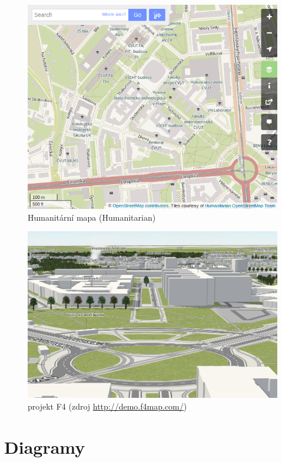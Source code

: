 \begin{figure}[H]
    \centering
    \includegraphics[width=11.5cm]{pictures/osm_humanitarian.png} 
    \caption{Humanitární mapa (Humanitarian)}
    \label{fig:humanitarian}
\end{figure}

\begin{figure}[H]
    \centering
    \includegraphics[width=11.5cm]{pictures/F4.png} 
    \caption{projekt F4 (zdroj \url{http://demo.f4map.com/})}
    \label{fig:F4}
\end{figure}


\chapter{Diagramy}
\label{digramy}

